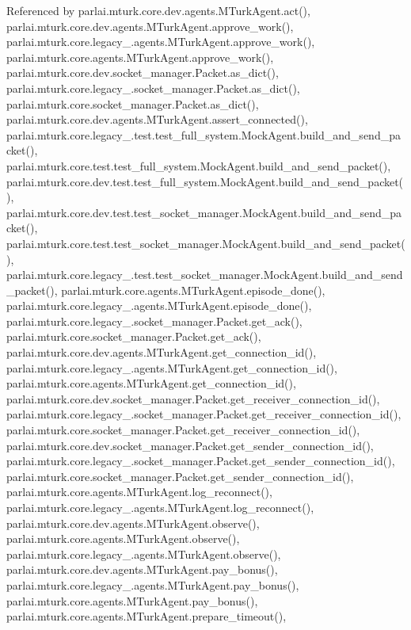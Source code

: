 Referenced by parlai.\+mturk.\+core.\+dev.\+agents.\+M\+Turk\+Agent.\+act(), parlai.\+mturk.\+core.\+dev.\+agents.\+M\+Turk\+Agent.\+approve\+\_\+work(), parlai.\+mturk.\+core.\+legacy\+\_.\+agents.\+M\+Turk\+Agent.\+approve\+\_\+work(), parlai.\+mturk.\+core.\+agents.\+M\+Turk\+Agent.\+approve\+\_\+work(), parlai.\+mturk.\+core.\+dev.\+socket\+\_\+manager.\+Packet.\+as\+\_\+dict(), parlai.\+mturk.\+core.\+legacy\+\_.\+socket\+\_\+manager.\+Packet.\+as\+\_\+dict(), parlai.\+mturk.\+core.\+socket\+\_\+manager.\+Packet.\+as\+\_\+dict(), parlai.\+mturk.\+core.\+dev.\+agents.\+M\+Turk\+Agent.\+assert\+\_\+connected(), parlai.\+mturk.\+core.\+legacy\+\_.\+test.\+test\+\_\+full\+\_\+system.\+Mock\+Agent.\+build\+\_\+and\+\_\+send\+\_\+packet(), parlai.\+mturk.\+core.\+test.\+test\+\_\+full\+\_\+system.\+Mock\+Agent.\+build\+\_\+and\+\_\+send\+\_\+packet(), parlai.\+mturk.\+core.\+dev.\+test.\+test\+\_\+full\+\_\+system.\+Mock\+Agent.\+build\+\_\+and\+\_\+send\+\_\+packet(), parlai.\+mturk.\+core.\+dev.\+test.\+test\+\_\+socket\+\_\+manager.\+Mock\+Agent.\+build\+\_\+and\+\_\+send\+\_\+packet(), parlai.\+mturk.\+core.\+test.\+test\+\_\+socket\+\_\+manager.\+Mock\+Agent.\+build\+\_\+and\+\_\+send\+\_\+packet(), parlai.\+mturk.\+core.\+legacy\+\_.\+test.\+test\+\_\+socket\+\_\+manager.\+Mock\+Agent.\+build\+\_\+and\+\_\+send\+\_\+packet(), parlai.\+mturk.\+core.\+agents.\+M\+Turk\+Agent.\+episode\+\_\+done(), parlai.\+mturk.\+core.\+legacy\+\_.\+agents.\+M\+Turk\+Agent.\+episode\+\_\+done(), parlai.\+mturk.\+core.\+legacy\+\_.\+socket\+\_\+manager.\+Packet.\+get\+\_\+ack(), parlai.\+mturk.\+core.\+socket\+\_\+manager.\+Packet.\+get\+\_\+ack(), parlai.\+mturk.\+core.\+dev.\+agents.\+M\+Turk\+Agent.\+get\+\_\+connection\+\_\+id(), parlai.\+mturk.\+core.\+legacy\+\_.\+agents.\+M\+Turk\+Agent.\+get\+\_\+connection\+\_\+id(), parlai.\+mturk.\+core.\+agents.\+M\+Turk\+Agent.\+get\+\_\+connection\+\_\+id(), parlai.\+mturk.\+core.\+dev.\+socket\+\_\+manager.\+Packet.\+get\+\_\+receiver\+\_\+connection\+\_\+id(), parlai.\+mturk.\+core.\+legacy\+\_.\+socket\+\_\+manager.\+Packet.\+get\+\_\+receiver\+\_\+connection\+\_\+id(), parlai.\+mturk.\+core.\+socket\+\_\+manager.\+Packet.\+get\+\_\+receiver\+\_\+connection\+\_\+id(), parlai.\+mturk.\+core.\+dev.\+socket\+\_\+manager.\+Packet.\+get\+\_\+sender\+\_\+connection\+\_\+id(), parlai.\+mturk.\+core.\+legacy\+\_.\+socket\+\_\+manager.\+Packet.\+get\+\_\+sender\+\_\+connection\+\_\+id(), parlai.\+mturk.\+core.\+socket\+\_\+manager.\+Packet.\+get\+\_\+sender\+\_\+connection\+\_\+id(), parlai.\+mturk.\+core.\+agents.\+M\+Turk\+Agent.\+log\+\_\+reconnect(), parlai.\+mturk.\+core.\+legacy\+\_.\+agents.\+M\+Turk\+Agent.\+log\+\_\+reconnect(), parlai.\+mturk.\+core.\+dev.\+agents.\+M\+Turk\+Agent.\+observe(), parlai.\+mturk.\+core.\+agents.\+M\+Turk\+Agent.\+observe(), parlai.\+mturk.\+core.\+legacy\+\_.\+agents.\+M\+Turk\+Agent.\+observe(), parlai.\+mturk.\+core.\+dev.\+agents.\+M\+Turk\+Agent.\+pay\+\_\+bonus(), parlai.\+mturk.\+core.\+legacy\+\_.\+agents.\+M\+Turk\+Agent.\+pay\+\_\+bonus(), parlai.\+mturk.\+core.\+agents.\+M\+Turk\+Agent.\+pay\+\_\+bonus(), parlai.\+mturk.\+core.\+agents.\+M\+Turk\+Agent.\+prepare\+\_\+timeout(), 